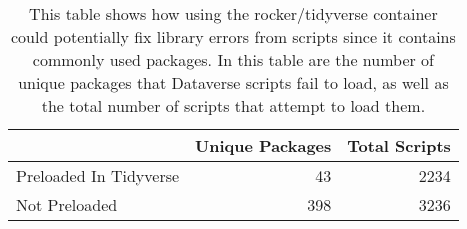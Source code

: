 \begin{table}
\centering
\caption{This table shows how using the rocker/tidyverse container could potentially fix library errors from scripts since it contains commonly used packages. In this table are the number of unique packages that Dataverse scripts fail to load, as well as the total number of scripts that attempt to load them.}
\label{tab:packs-in-tidy}
\begin{tabular}{lrr}
\toprule
{} &  Unique Packages &  Total Scripts \\
\midrule
Preloaded In Tidyverse &               43 &           2234 \\ \hline
Not Preloaded          &              398 &           3236 \\
\bottomrule
\end{tabular}
\end{table}
